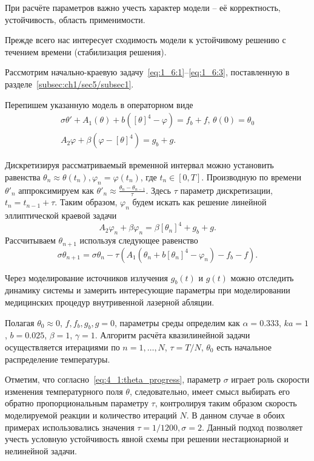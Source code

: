 При расчёте параметров важно учесть характер модели -- её корректность, устойчивость,
область применимости.

Прежде всего нас интересует сходимость модели к устойчивому
решению с течением времени (стабилизация решения).

Рассмотрим начально-краевую задачу~\eqref{eq:1_6:1}--\eqref{eq:1_6:3},
поставленную в разделе~\ref{subsec:ch1/sec5/subsec1}.

Перепишем указанную модель в операторном виде
\begin{equation}
    \label{eq:4_1:nonst_op}
    \begin{gathered}
        \sigma \theta' + A_1(\theta) + b([\theta]^4 - \varphi) = f_b + f, \, \theta(0) = \theta_0 \\
        A_2\varphi + \beta(\varphi - [\theta]^4) = g_b + g.
    \end{gathered}
\end{equation}

Дискретизируя рассматриваемый временной интервал можно установить равенства
$\theta_n \approx \theta(t_n), \varphi_n = \varphi(t_n)$, где $t_n \in [0, T]$.
Производную по времени $\theta'_n$ аппроксимируем как
$\theta'_{n} \approx \frac{\theta_{n} - \theta_{n-1}}{\tau}$.
Здесь $\tau$ параметр дискретизации, $t_n = t_{n-1} + \tau$.
Таким образом, $\varphi_n$ будем искать как решение линейной эллиптической краевой задачи
\[
    A_2 \varphi_n + \beta \varphi_n = \beta [\theta_n]^4 + g_b + g.
\]
Рассчитываем $\theta_{n+1}$ используя следующее равенство
\begin{equation}
    \label{eq:4_1:theta_progress}
    \sigma \theta_{n+1} = \sigma \theta_n - \tau (A_1(\theta_n + b[\theta_n]^4 - \varphi_n) - f_b -f).
\end{equation}

Через моделирование источников излучения $g_b(t)$ и $g(t)$ можно отследить динамику системы и замерить
интересующие параметры при моделировании медицинских процедур внутривенной лазерной абляции.

Полагая $\theta_0 \approx 0$, $f, f_b, g_b, g = 0$, параметры среды определим как
$\alpha = 0.333$,
$ka = 1$,
$b = 0.025$,
$\beta = 1$,
$\gamma = 1$.
Алгоритм расчёта квазилинейной задачи осуществляется итерациями по $n = 1,\dots, N$, $\tau = T/N$,
$\theta_0$ есть начальное распределение температуры.

\begin{remark}
Отметим, что согласно~\eqref{eq:4_1:theta_progress},
параметр $\sigma$ играет роль скорости изменения температурного поля $\theta$, следовательно,
имеет смысл выбирать его обратно пропорциональным параметру $\tau$,
контролируя таким образом скорость моделируемой реакции и количество итераций $N$.
В данном случае в обоих примерах использовались значения $\tau = 1/1200, \sigma = 2$.
Данный подход позволяет учесть условную
устойчивость явной схемы при решении
нестационарной и нелинейной задачи.
\end{remark}

